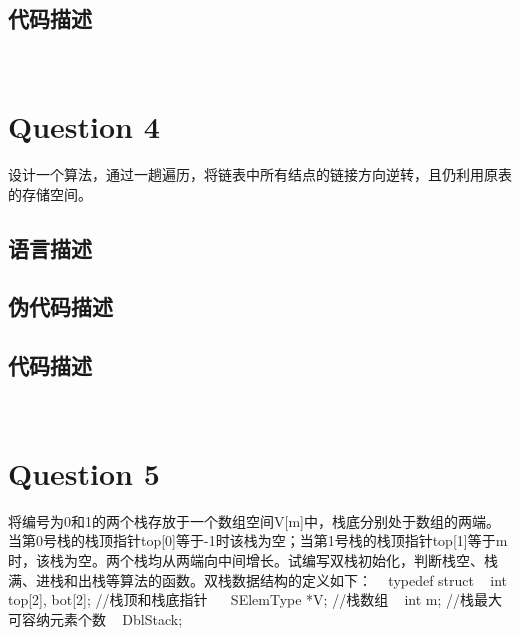 \documentclass{article}
\begin{document}
\subsection{代码描述}

\begin{verbatim}


\end{verbatim}

\section{Question 4} 

设计一个算法，通过一趟遍历，将链表中所有结点的链接方向逆转，且仍利用原表的存储空间。


\subsection{语言描述} 



\subsection{伪代码描述}



\begin{codebox}


\end{codebox}



\subsection{代码描述}

\begin{verbatim}


\end{verbatim}

\section{Question 5} 


将编号为0和1的两个栈存放于一个数组空间V[m]中，栈底分别处于数组的两端。当第0号栈的栈顶指针top[0]等于-1时该栈为空；当第1号栈的栈顶指针top[1]等于m时，该栈为空。两个栈均从两端向中间增长。试编写双栈初始化，判断栈空、栈满、进栈和出栈等算法的函数。双栈数据结构的定义如下：
  typedef struct{
    int top[2], bot[2];  //栈顶和栈底指针
　  SElemType *V;      	//栈数组 
    int m;          	//栈最大可容纳元素个数
  }DblStack;
\end{document}
